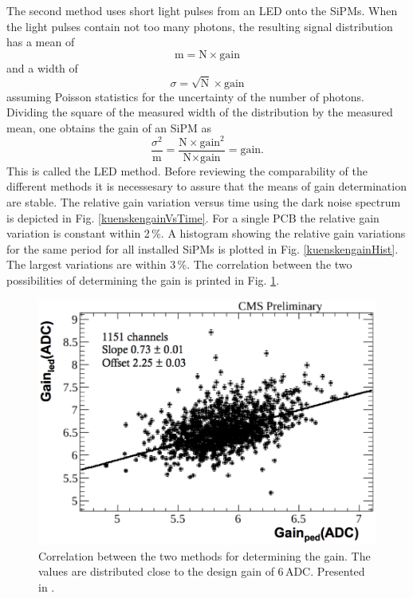 The second method uses short light pulses from an LED onto the SiPMs. When the light pulses contain not too many photons, the resulting signal distribution has a mean of
\begin{equation}
\text{m}=\text{N}\times \text{gain}
\end{equation}
and a width of
\begin{equation}
\sigma=\sqrt{\text{N}}\times \text{gain}
\end{equation}
assuming Poisson statistics for the uncertainty of the number of photons. Dividing the square of the measured width of the distribution by the measured mean, one obtains the gain of an SiPM as
\begin{equation}
\frac{\sigma^2}{\text{m}}=\frac{\text{N}\times \text{gain}^2}{\text{N}\times \text{gain}}=\text{gain.}
\end{equation}
This is called the LED method.
Before reviewing the comparability of the different methods it is necessesary to assure that the means of gain determination are stable. The relative gain variation versus time using the dark noise
spectrum is depicted in Fig. \ref{kuenskengainVsTime}. For a single PCB the relative gain variation is constant within 2\,\%. A histogram showing the relative gain variations for the same period for all installed SiPMs is plotted in Fig. \ref{kuenskengainHist}. The largest variations are within 3\,\%. The correlation between the two possibilities of determining the gain is printed in Fig. \ref{kuenskengainCorr}.
\begin{figure}[b]
\centering
\begin{minipage}[b]{0.475\textwidth}
\includegraphics[width=\textwidth]{Figures/kuensken/gainCorrelation.png}
\end{minipage}
\hspace{0.5cm}
\begin{minipage}[b]{0.475\textwidth}
\caption{Correlation between the two methods for determining the gain. The values are distributed close to the design gain of 6\,ADC. Presented in \cite{kuenskenCalor}.}
\label{kuenskengainCorr}
\end{minipage}
\end{figure}
